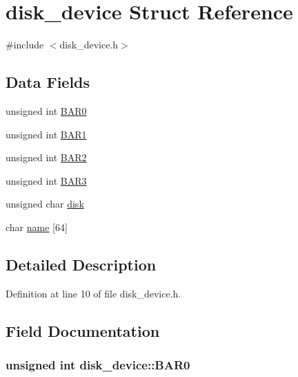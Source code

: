 \hypertarget{structdisk__device}{
\section{disk\_\-device Struct Reference}
\label{structdisk__device}
}


{\ttfamily \#include $<$disk\_\-device.h$>$}

\subsection*{Data Fields}
\begin{DoxyCompactItemize}
\item 
unsigned int \hyperlink{structdisk__device_a7ff01eb3be1ae47668ba5e27b32ac07a}{BAR0}
\item 
unsigned int \hyperlink{structdisk__device_a066811c5884f4a33a7142a4a3bc441e2}{BAR1}
\item 
unsigned int \hyperlink{structdisk__device_a63aa54abd416441bc8f21baba6f44781}{BAR2}
\item 
unsigned int \hyperlink{structdisk__device_ab3e1b2e30dec98cc6fcd522d3e61da51}{BAR3}
\item 
unsigned char \hyperlink{structdisk__device_ae63dd67fa78f27e21a526856b1bcdaad}{disk}
\item 
char \hyperlink{structdisk__device_a805f966d368060c484d324d5d990fcf5}{name} \mbox{[}64\mbox{]}
\end{DoxyCompactItemize}


\subsection{Detailed Description}


Definition at line 10 of file disk\_\-device.h.



\subsection{Field Documentation}
\hypertarget{structdisk__device_a7ff01eb3be1ae47668ba5e27b32ac07a}{
\subsubsection[{BAR0}]{\setlength{\rightskip}{0pt plus 5cm}unsigned int {\bf disk\_\-device::BAR0}}}
\label{structdisk__device_a7ff01eb3be1ae47668ba5e27b32ac07a}


